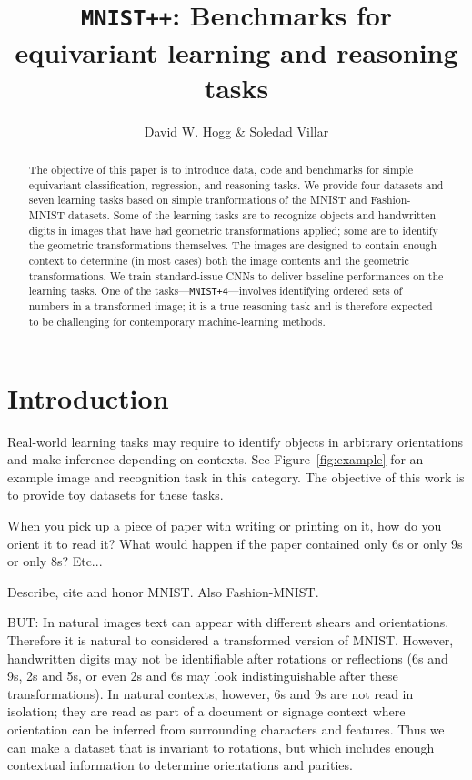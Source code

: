 \documentclass{article}
\title{\bfseries \texttt{MNIST++}: Benchmarks for equivariant learning and reasoning tasks}
\author{David W. Hogg \& Soledad Villar}
\date{}
\begin{document}
\maketitle

\begin{abstract}\noindent
    The objective of this paper is to introduce data, code and benchmarks for simple equivariant classification, regression, and reasoning tasks.
    We provide four datasets and seven learning tasks based on simple tranformations of the MNIST and Fashion-MNIST datasets.
    Some of the learning tasks are to recognize objects and handwritten digits in images that have had geometric transformations applied; some are to identify the geometric transformations themselves.
    The images are designed to contain enough context to determine (in most cases) both the image contents and the geometric transformations.
    We train standard-issue CNNs to deliver baseline performances on the learning tasks.
    One of the tasks---\texttt{MNIST+4}---involves identifying ordered sets of numbers in a transformed image; it is a true reasoning task and is therefore expected to be challenging for contemporary machine-learning methods.
\end{abstract}

\section{Introduction}

Real-world learning tasks may require to identify objects in arbitrary orientations and make inference depending on contexts. 
See Figure~\ref{fig:example} for an example image and recognition task in this category.
The objective of this work is to provide toy datasets for these tasks. 

When you pick up a piece of paper with writing or printing on it, how do you orient it to read it?
What would happen if the paper contained only 6s or only 9s or only 8s?
Etc...

Describe, cite and honor MNIST. Also Fashion-MNIST.

BUT: In natural images text can appear with different shears and orientations.
Therefore it is natural to considered a transformed version of MNIST. However, handwritten digits may not be identifiable after rotations or reflections (6s and 9s, 2s and 5s, or even 2s and 6s may look indistinguishable after these transformations).
In natural contexts, however, 6s and 9s are not read in isolation; they are read as part of a document or signage context where orientation can be inferred from surrounding characters and features.
Thus we can make a dataset that is invariant to rotations, but which includes enough contextual information to determine orientations and parities.
\end{document}
